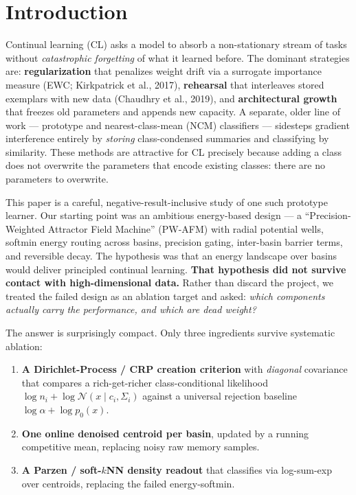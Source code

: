 \documentclass[11pt,a4paper]{article}
\begin{document}
\section{Introduction}

Continual learning (CL) asks a model to absorb a non-stationary stream of tasks without \textit{catastrophic forgetting} of what it learned before. The dominant strategies are: \textbf{regularization} that penalizes weight drift via a surrogate importance measure (EWC; Kirkpatrick et al., 2017), \textbf{rehearsal} that interleaves stored exemplars with new data (Chaudhry et al., 2019), and \textbf{architectural growth} that freezes old parameters and appends new capacity. A separate, older line of work — prototype and nearest-class-mean (NCM) classifiers — sidesteps gradient interference entirely by \textit{storing} class-condensed summaries and classifying by similarity. These methods are attractive for CL precisely because adding a class does not overwrite the parameters that encode existing classes: there are no parameters to overwrite.

This paper is a careful, negative-result-inclusive study of one such prototype learner. Our starting point was an ambitious energy-based design — a ``Precision-Weighted Attractor Field Machine'' (PW-AFM) with radial potential wells, softmin energy routing across basins, precision gating, inter-basin barrier terms, and reversible decay. The hypothesis was that an energy landscape over basins would deliver principled continual learning. \textbf{That hypothesis did not survive contact with high-dimensional data.} Rather than discard the project, we treated the failed design as an ablation target and asked: \textit{which components actually carry the performance, and which are dead weight?}

The answer is surprisingly compact. Only three ingredients survive systematic ablation:

\begin{enumerate}[label=(\arabic*),leftmargin=*]
\item \textbf{A Dirichlet-Process / CRP creation criterion} with \textit{diagonal} covariance that compares a rich-get-richer class-conditional likelihood $\log n_i + \log\mathcal{N}(x \mid c_i,\Sigma_i)$ against a universal rejection baseline $\log\alpha + \log p_0(x)$.
\item \textbf{One online denoised centroid per basin}, updated by a running competitive mean, replacing noisy raw memory samples.
\item \textbf{A Parzen / soft-$k$NN density readout} that classifies via log-sum-exp over centroids, replacing the failed energy-softmin.
\end{enumerate}
\end{document}
